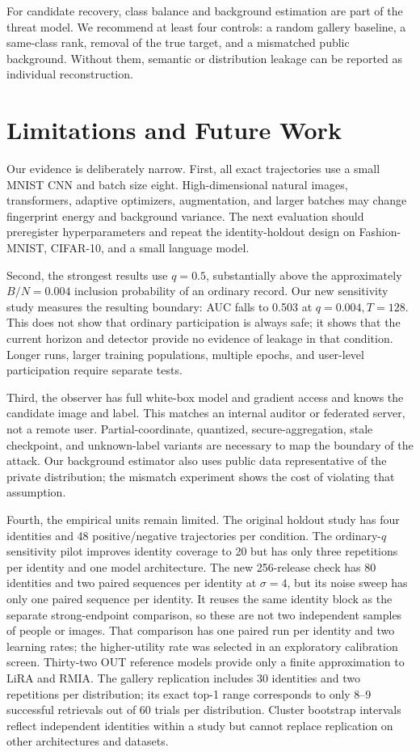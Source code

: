 \documentclass[conference]{IEEEtran}
\begin{document}
For candidate recovery, class balance and background estimation are part of the threat model. We recommend at least four controls: a random gallery baseline, a same-class rank, removal of the true target, and a mismatched public background. Without them, semantic or distribution leakage can be reported as individual reconstruction.

\section{Limitations and Future Work}

Our evidence is deliberately narrow. First, all exact trajectories use a small MNIST CNN and batch size eight. High-dimensional natural images, transformers, adaptive optimizers, augmentation, and larger batches may change fingerprint energy and background variance. The next evaluation should preregister hyperparameters and repeat the identity-holdout design on Fashion-MNIST, CIFAR-10, and a small language model.

Second, the strongest results use $q=0.5$, substantially above the approximately $B/N=0.004$ inclusion probability of an ordinary record. Our new sensitivity study measures the resulting boundary: AUC falls to 0.503 at $q=0.004,T=128$. This does not show that ordinary participation is always safe; it shows that the current horizon and detector provide no evidence of leakage in that condition. Longer runs, larger training populations, multiple epochs, and user-level participation require separate tests.

Third, the observer has full white-box model and gradient access and knows the candidate image and label. This matches an internal auditor or federated server, not a remote user. Partial-coordinate, quantized, secure-aggregation, stale checkpoint, and unknown-label variants are necessary to map the boundary of the attack. Our background estimator also uses public data representative of the private distribution; the mismatch experiment shows the cost of violating that assumption.

Fourth, the empirical units remain limited. The original holdout study has four identities and 48 positive/negative trajectories per condition. The ordinary-$q$ sensitivity pilot improves identity coverage to 20 but has only three repetitions per identity and one model architecture. The new 256-release check has 80 identities and two paired sequences per identity at $\sigma=4$, but its noise sweep has only one paired sequence per identity. It reuses the same identity block as the separate strong-endpoint comparison, so these are not two independent samples of people or images. That comparison has one paired run per identity and two learning rates; the higher-utility rate was selected in an exploratory calibration screen. Thirty-two OUT reference models provide only a finite approximation to LiRA and RMIA. The gallery replication includes 30 identities and two repetitions per distribution; its exact top-1 range corresponds to only 8--9 successful retrievals out of 60 trials per distribution. Cluster bootstrap intervals reflect independent identities within a study but cannot replace replication on other architectures and datasets.
\end{document}
